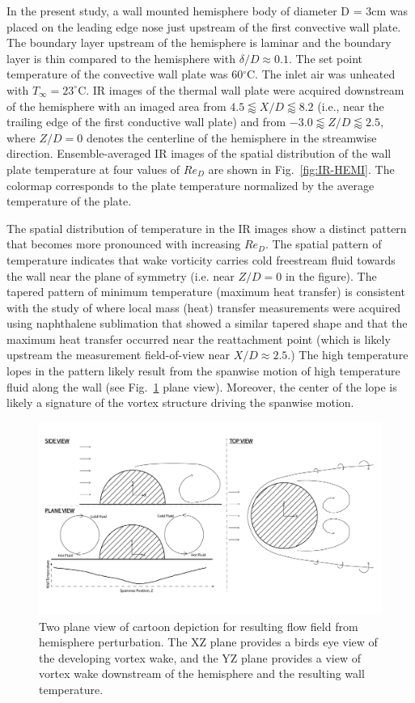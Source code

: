 In the present study, a wall mounted hemisphere body of diameter D = 3cm was placed on the leading edge nose just upstream of the first convective wall plate. 
The boundary layer upstream of the hemisphere is laminar and the boundary layer is thin compared to the hemisphere with $\delta/D \approx 0.1$.  The set point temperature of the convective wall plate was 60$^\circ$C. The inlet air was unheated with $T_\infty = 23^\circ$C. IR images of the thermal wall plate were acquired downstream of the hemisphere with an imaged area from $4.5 \lessapprox X/D \lessapprox 8.2$ (i.e., near the trailing edge of the first conductive wall plate) and from $-3.0 \lessapprox Z/D \lessapprox 2.5$, where $Z/D=0$ denotes the centerline of the hemisphere in the streamwise direction. 
Ensemble-averaged IR images of the spatial distribution of the wall plate temperature at four values of $Re_D$ are shown in Fig.~\ref{fig:IR-HEMI}. The colormap corresponds to the plate temperature normalized by the average temperature of the plate.  

The spatial distribution of temperature in the IR images show a distinct pattern that becomes more pronounced with increasing $Re_D$. The spatial pattern of temperature indicates that wake vorticity carries cold freestream fluid towards the wall near the plane of symmetry (i.e. near $Z/D = 0$ in the figure). The tapered pattern of minimum temperature (maximum heat transfer) is consistent with the study of \cite{Chyu1996} where local mass (heat) transfer measurements were acquired using naphthalene sublimation that showed a similar tapered shape and that the maximum heat transfer occurred near the reattachment point (which is likely upstream the measurement field-of-view near $X/D \approx 2.5$.) The high temperature lopes in the pattern likely result from the spanwise motion of high temperature fluid along the wall (see Fig.~\ref{fig:HEMI-Cartoon} plane view). Moreover, the center of the lope is likely a signature of the vortex structure driving the spanwise motion. 

\begin{figure}[h!]
\centering
\includegraphics[scale=.3]{figures/facility/hemi_cartoon_v3.png}
\caption{Two plane view of cartoon depiction for resulting flow field from hemisphere perturbation. The XZ plane provides a birds eye view of the developing vortex wake, and the YZ plane provides a view of vortex wake downstream of the hemisphere and the resulting wall temperature.} 
\label{fig:HEMI-Cartoon}
\end{figure}


